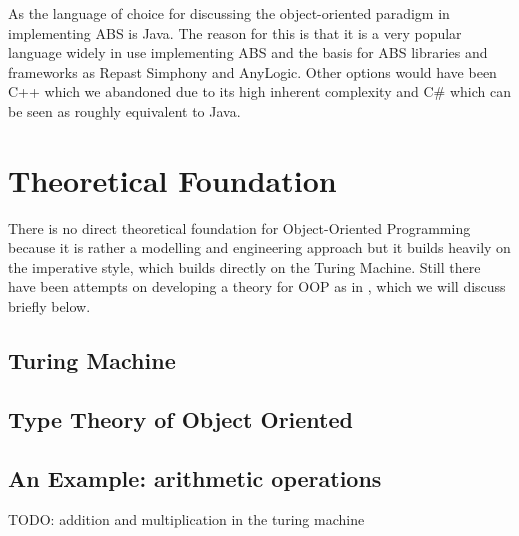 As the language of choice for discussing the object-oriented paradigm in implementing ABS is Java. The reason for this is that it is a very popular language widely in use implementing ABS and the basis for ABS libraries and frameworks as Repast Simphony and AnyLogic. Other options would have been C++ which we abandoned due to its high inherent complexity and C\# which can be seen as roughly equivalent to Java.

\section{Theoretical Foundation}
There is no direct theoretical foundation for Object-Oriented Programming because it is rather a modelling and engineering approach but it builds heavily on the imperative style, which builds directly on the Turing Machine. Still there have been attempts on developing a theory for OOP as in \cite{abadi_theory_1996}, which we will discuss briefly below.

\subsection{Turing Machine}
\cite{webber_formal_2008}

\subsection{Type Theory of Object Oriented}
\cite{abadi_theory_1996}

\subsection{An Example: arithmetic operations }
TODO: addition and multiplication in the turing machine